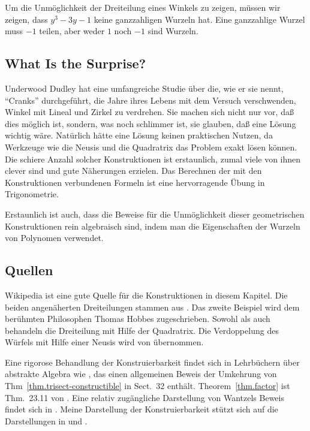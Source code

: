 Um die Unmöglichkeit der Dreiteilung eines Winkels zu zeigen, müssen wir zeigen, dass $y^3-3y-1$ keine ganzzahligen Wurzeln hat. Eine ganzzahlige Wurzel muss $-1$ teilen, aber weder $1$ noch $-1$ sind Wurzeln.

\subsection*{What Is the Surprise?}

Underwood Dudley hat eine umfangreiche Studie über die, wie er sie nennt, ``Cranks'' durchgeführt, die Jahre ihres Lebens mit dem Versuch verschwenden, Winkel mit Lineal und Zirkel zu verdrehen. Sie machen sich nicht nur vor, daß dies möglich ist, sondern, was noch schlimmer ist, sie glauben, daß eine Lösung wichtig wäre. Natürlich hätte eine Lösung keinen praktischen Nutzen, da Werkzeuge wie die Neusis und die Quadratrix das Problem exakt lösen können. Die schiere Anzahl solcher Konstruktionen ist erstaunlich, zumal viele von ihnen clever sind und gute Näherungen erzielen. Das Berechnen der mit den Konstruktionen verbundenen Formeln ist eine hervorragende Übung in Trigonometrie.

Erstaunlich ist auch, dass die Beweise für die Unmöglichkeit dieser geometrischen Konstruktionen rein algebraisch sind, indem man die Eigenschaften der Wurzeln von Polynomen verwendet.

\subsection*{Quellen}

Wikipedia \cite{wiki:tri, wiki:neu, wiki:quad} ist eine gute Quelle für die Konstruktionen in diesem Kapitel.
Die beiden angenäherten Dreiteilungen stammen aus \cite[pp.
~67--68, 95--96]{dudley-budget}. Das zweite Beispiel wird dem berühmten Philosophen Thomas Hobbes zugeschrieben. Sowohl \cite[pp.~48--49]{martin} als auch \cite[pp.~6--7]{dudley-budget} behandeln die Dreiteilung mit Hilfe der Quadratrix.
Die Verdoppelung des Würfels mit Hilfe einer Neusis wird von \cite{dorrie2} übernommen.

Eine rigorose Behandlung der Konstruierbarkeit findet sich in Lehrbüchern über abstrakte Algebra wie \cite{fraleigh}, das einen allgemeinen Beweis der Umkehrung von Thm~\ref{thm.trisect-constructible} in Sect.~32 enthält.
Theorem~\ref{thm.factor} ist Thm.~23.11 von \cite{fraleigh}.
Eine relativ zugängliche Darstellung von Wantzels Beweis findet sich in \cite{suzuki}. Meine Darstellung der Konstruierbarkeit stützt sich auf die Darstellungen in \cite[Kap.~III]{courant} und \cite{laugwitz}.

